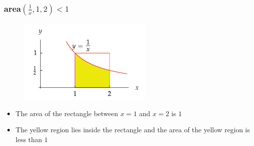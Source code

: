 \documentclass{beamer}
\begin{document}
\begin{frame}
  \frametitle{area\((\frac{1}{x},1,2) < 1 \) }
  \begin{figure}
    \includegraphics[scale=0.8]{e_2.png}
  \end{figure}
  \begin{itemize}
    \item The area of the rectangle between \(x=1\) and \(x=2\) is \(1\) 
    \item The yellow region lies inside the rectangle and the area of the yellow region is less than \(1\) 
  \end{itemize}
\end{frame}
\end{document}
